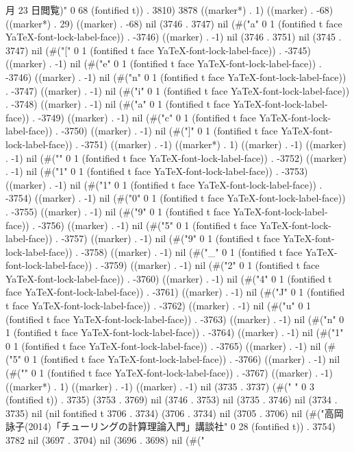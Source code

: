 	月 23 日閲覧)" 0 68 (fontified t)) . 3810) 3878 ((marker*) . 1) ((marker) . -68) ((marker*) . 29) ((marker) . -68) nil (3746 . 3747) nil (#("a" 0 1 (fontified t face YaTeX-font-lock-label-face)) . -3746) ((marker) . -1) nil (3746 . 3751) nil (3745 . 3747) nil (#("[" 0 1 (fontified t face YaTeX-font-lock-label-face)) . -3745) ((marker) . -1) nil (#("e" 0 1 (fontified t face YaTeX-font-lock-label-face)) . -3746) ((marker) . -1) nil (#("n" 0 1 (fontified t face YaTeX-font-lock-label-face)) . -3747) ((marker) . -1) nil (#("i" 0 1 (fontified t face YaTeX-font-lock-label-face)) . -3748) ((marker) . -1) nil (#("a" 0 1 (fontified t face YaTeX-font-lock-label-face)) . -3749) ((marker) . -1) nil (#("c" 0 1 (fontified t face YaTeX-font-lock-label-face)) . -3750) ((marker) . -1) nil (#("]" 0 1 (fontified t face YaTeX-font-lock-label-face)) . -3751) ((marker) . -1) ((marker*) . 1) ((marker) . -1) ((marker) . -1) nil (#("{" 0 1 (fontified t face YaTeX-font-lock-label-face)) . -3752) ((marker) . -1) nil (#("1" 0 1 (fontified t face YaTeX-font-lock-label-face)) . -3753) ((marker) . -1) nil (#("1" 0 1 (fontified t face YaTeX-font-lock-label-face)) . -3754) ((marker) . -1) nil (#("0" 0 1 (fontified t face YaTeX-font-lock-label-face)) . -3755) ((marker) . -1) nil (#("9" 0 1 (fontified t face YaTeX-font-lock-label-face)) . -3756) ((marker) . -1) nil (#("5" 0 1 (fontified t face YaTeX-font-lock-label-face)) . -3757) ((marker) . -1) nil (#("9" 0 1 (fontified t face YaTeX-font-lock-label-face)) . -3758) ((marker) . -1) nil (#("_" 0 1 (fontified t face YaTeX-font-lock-label-face)) . -3759) ((marker) . -1) nil (#("2" 0 1 (fontified t face YaTeX-font-lock-label-face)) . -3760) ((marker) . -1) nil (#("4" 0 1 (fontified t face YaTeX-font-lock-label-face)) . -3761) ((marker) . -1) nil (#("J" 0 1 (fontified t face YaTeX-font-lock-label-face)) . -3762) ((marker) . -1) nil (#("u" 0 1 (fontified t face YaTeX-font-lock-label-face)) . -3763) ((marker) . -1) nil (#("n" 0 1 (fontified t face YaTeX-font-lock-label-face)) . -3764) ((marker) . -1) nil (#("1" 0 1 (fontified t face YaTeX-font-lock-label-face)) . -3765) ((marker) . -1) nil (#("5" 0 1 (fontified t face YaTeX-font-lock-label-face)) . -3766) ((marker) . -1) nil (#("}" 0 1 (fontified t face YaTeX-font-lock-label-face)) . -3767) ((marker) . -1) ((marker*) . 1) ((marker) . -1) ((marker) . -1) nil (3735 . 3737) (#("	  " 0 3 (fontified t)) . 3735) (3753 . 3769) nil (3746 . 3753) nil (3735 . 3746) nil (3734 . 3735) nil (nil fontified t 3706 . 3734) (3706 . 3734) nil (3705 . 3706) nil (#("高岡詠子(2014)「チューリングの計算理論入門」講談社" 0 28 (fontified t)) . 3754) 3782 nil (3697 . 3704) nil (3696 . 3698) nil (#("
